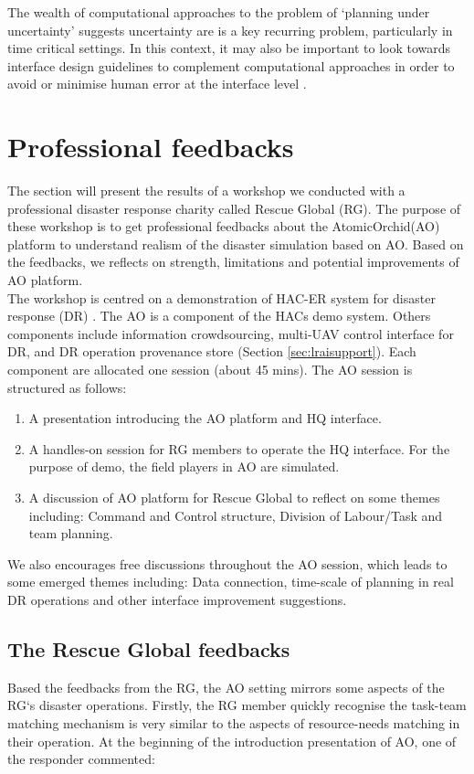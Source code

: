 The wealth of computational approaches to the problem of `planning under uncertainty' \cite{Chang2007} suggests uncertainty are is a key recurring problem, particularly in time critical settings. In this context, it may also be important to look towards interface design guidelines to complement computational approaches in order to avoid or minimise human error at the interface level \cite{Norman2013}.


\section{Professional feedbacks}\label{sec:RGworkshopone} 

The section will present the results of a workshop we conducted with a professional disaster response charity called Rescue Global (RG). The purpose of these workshop is to get professional feedbacks about the AtomicOrchid(AO) platform to understand realism of the disaster simulation based on AO. Based on the feedbacks, we reflects on strength, limitations and potential improvements of AO platform. \\

The workshop is centred on a demonstration of HAC-ER system for disaster response (DR) \cite{Ramchurn2015}. The AO is a component of the HACs demo system. Others components include information crowdsourcing, multi-UAV control interface for DR, and DR operation provenance store (Section \ref{sec:lraisupport}). Each component are allocated one session (about 45 mins). The AO session is structured as follows:\\

\begin{enumerate}
	\item A presentation introducing the AO platform and HQ interface.
	\item A handles-on session for RG members to operate the HQ interface. For the purpose of demo, the field players in AO are simulated.
	\item A discussion of AO platform for Rescue Global to reflect on some themes including: Command and Control structure, Division of Labour/Task and team planning.
\end{enumerate} 

We also encourages free discussions throughout the AO session, which leads to some emerged themes including: Data connection, time-scale of planning in real DR operations and other interface improvement suggestions.  

\subsection{The Rescue Global feedbacks}
Based the feedbacks from the \ac{RG}, the \ac{AO} setting  mirrors some aspects of the \ac{RG}`s disaster operations. Firstly, the \ac{RG} member quickly recognise the task-team matching mechanism is very similar to the aspects of resource-needs matching in their operation. At the beginning of the introduction presentation of \ac{AO}, one of the responder commented: \\


